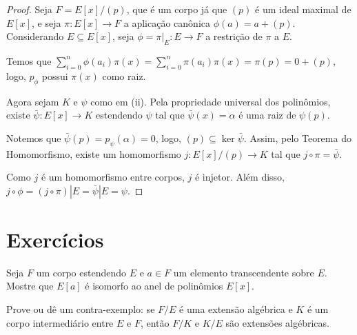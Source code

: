 \begin{proof}
    Seja $F=E[x]/(p)$, que é um corpo já que $(p)$ é um ideal maximal de $E[x]$, e seja $\pi: E[x]\rightarrow F$ a aplicação canônica $\phi(a)=a+(p)$.
    Considerando $E\subseteq E[x]$, seja $\phi=\pi|_E: E\rightarrow F$ a restrição de $\pi$ a $E$.

    Temos que $\sum_{i=0}^n\phi(a_i)\pi(x)=\sum_{i=0}^n\pi(a_i)\pi(x)=\pi(p)=0+(p)$, logo, $p_\phi$ possui $\pi(x)$ como raiz.

    Agora sejam $K$ e $\psi$ como em (ii). Pela propriedade universal dos polinômios, existe $\bar \psi: E[x]\rightarrow K$ estendendo $\psi$ tal que $\bar \psi(x)=\alpha$ é uma raiz de $\psi(p)$.

    Notemos que $\bar \psi(p)=p_\psi(\alpha)=0$, logo, $(p)\subseteq \ker \bar \psi$. Assim, pelo Teorema do Homomorfismo, existe um homomorfismo $j: E[x]/(p)\rightarrow K$ tal que $j\circ \pi = \bar \psi$.

    Como $j$ é um homomorfismo entre corpos, $j$ é injetor.
    Além disso, $j\circ \phi=(j\circ \pi)|E=\bar \psi|E=\psi$.

\end{proof}
\begin{definition}

\end{definition}
\section{Exercícios}
\begin{exer}
    Seja $F$ um corpo estendendo $E$ e $a \in F$ um elemento transcendente sobre $E$. Mostre que $E[a]$ é isomorfo ao anel de polinômios $E[x]$.
\end{exer}

\begin{exer}
    Prove ou dê um contra-exemplo: se $F/E$ é uma extensão algébrica e $K$ é um corpo intermediário entre $E$ e $F$, então $F/K$ e $K/E$ são extensões algébricas.
\end{exer}

